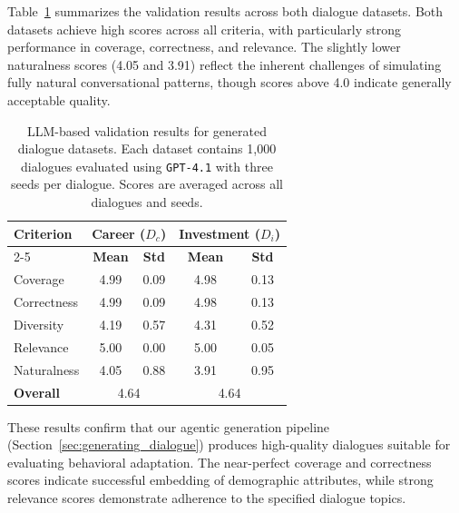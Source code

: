 \documentclass[acmlarge]{acmart}
\begin{document}
Table~\ref{tab:dialogue_validation_results} summarizes the validation results across both dialogue datasets. Both datasets achieve high scores across all criteria, with particularly strong performance in coverage, correctness, and relevance. The slightly lower naturalness scores (4.05 and 3.91) reflect the inherent challenges of simulating fully natural conversational patterns, though scores above 4.0 indicate generally acceptable quality.

\begin{table}[H]
\centering
\small
\begin{tabular}{l|cc|cc}
    \toprule
    \multirow{2}{*}{\textbf{Criterion}} & \multicolumn{2}{c|}{\textbf{Career ($D_c$)}} & \multicolumn{2}{c}{\textbf{Investment ($D_i$)}} \\
    \cmidrule{2-5}
    & \textbf{Mean} & \textbf{Std} & \textbf{Mean} & \textbf{Std} \\
    \midrule
    Coverage      & 4.99 & 0.09 & 4.98 & 0.13 \\
    Correctness   & 4.99 & 0.09 & 4.98 & 0.13 \\
    Diversity     & 4.19 & 0.57 & 4.31 & 0.52 \\
    Relevance     & 5.00 & 0.00 & 5.00 & 0.05 \\
    Naturalness   & 4.05 & 0.88 & 3.91 & 0.95 \\
    \midrule
    \textbf{Overall} & \multicolumn{2}{c|}{4.64} & \multicolumn{2}{c}{4.64} \\
    \bottomrule
\end{tabular}
\caption{LLM-based validation results for generated dialogue datasets. Each dataset contains 1,000 dialogues evaluated using \texttt{GPT-4.1} with three seeds per dialogue. Scores are averaged across all dialogues and seeds.}
\label{tab:dialogue_validation_results}
\end{table}

These results confirm that our agentic generation pipeline (Section~\ref{sec:generating_dialogue}) produces high-quality dialogues suitable for evaluating behavioral adaptation. The near-perfect coverage and correctness scores indicate successful embedding of demographic attributes, while strong relevance scores demonstrate adherence to the specified dialogue topics.
\end{document}
